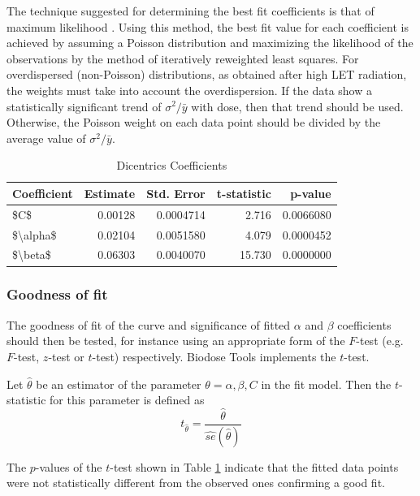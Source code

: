 \documentclass[]{scrartcl}
\begin{document}
The technique suggested for determining the best fit coefficients is that of maximum likelihood \citep{Papworth1975, Merkle1983}. Using this method, the best fit value for each coefficient is achieved by assuming a Poisson distribution and maximizing the likelihood of the observations by the method of iteratively reweighted least squares. For overdispersed (non-Poisson) distributions, as obtained after high LET radiation, the weights must take into account the overdispersion. If the data show a statistically significant trend of \(\sigma^{2}/\bar{y}\) with dose, then that trend should be used. Otherwise, the Poisson weight on each data point should be divided by the average value of \(\sigma^{2}/\bar{y}\).

\begin{table}

\caption{\label{tab:dic-coeffs}Dicentrics Coefficients}
\centering
\begin{tabular}[t]{lrrrr}
\toprule
Coefficient & Estimate & Std. Error & t-statistic & p-value\\
\midrule
\$C\$ & 0.00128 & 0.0004714 & 2.716 & 0.0066080\\
\$\textbackslash{}alpha\$ & 0.02104 & 0.0051580 & 4.079 & 0.0000452\\
\$\textbackslash{}beta\$ & 0.06303 & 0.0040070 & 15.730 & 0.0000000\\
\bottomrule
\end{tabular}
\end{table}

\hypertarget{goodness-of-fit}{%
\subsubsection{Goodness of fit}\label{goodness-of-fit}}

The goodness of fit of the curve and significance of fitted \(\alpha\) and \(\beta\) coefficients should then be tested, for instance using an appropriate form of the \(F\)-test (e.g.~\(F\)-test, \(z\)-test or \(t\)-test) respectively. Biodose Tools implements the \(t\)-test.

Let \(\hat{\theta}\) be an estimator of the parameter \(\theta = \alpha, \beta, C\) in the fit model. Then the \(t\)-statistic for this parameter is defined as
\begin{equation} 
  t_{\hat{\theta}} = \frac{\hat{\theta}}{\widehat{se}(\hat{\theta})}
  \label{eq:t-test}
\end{equation}

The \(p\)-values of the \(t\)-test shown in Table \ref{tab:dic-coeffs} indicate that the fitted data points were not statistically different from the observed ones confirming a good fit.
\end{document}

